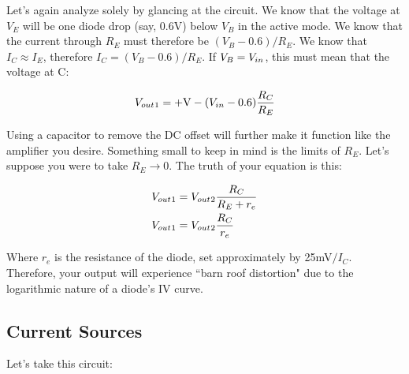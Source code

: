 Let's again analyze solely by glancing at the circuit. We know that the voltage at $V_E$ will be one diode drop (say, 0.6V) below $V_B$ in the active mode. We know that the current through $R_E$ must therefore be $(V_B - 0.6) / R_E$. We know that $I_C \approx I_E$, therefore $I_C = (V_B - 0.6) / R_E$. If $V_B = {V}_{in}$, this must mean that the voltage at C: 

\begin{equation} \label{trans3}
\begin{split}
{V}_{out}{}_1 = +{\rm V} - ({V}_{in} - 0.6)\frac{R_C}{R_E}
\end{split}
\end{equation}

Using a capacitor to remove the DC offset will further make it function like the amplifier you desire. Something small to keep in mind is the limits of $R_E$. Let's suppose you were to take $R_E \rightarrow 0$. The truth of your equation is this: 

\begin{equation} \label{trans3}
\begin{split}
{V}_{out}{}_1 &= {V}_{out}{}_2\frac{R_C}{R_E + r_e} \\
{V}_{out}{}_1 &= {V}_{out}{}_2\frac{R_C}{r_e}
\end{split}
\end{equation}

Where $r_e$ is the resistance of the diode, set approximately by 25mV$/I_C$. Therefore, your output will experience ``barn roof distortion" due to the logarithmic nature of a diode's IV curve.  


\vfill\pagebreak


\subsection{Current Sources}

Let's take this circuit: 

